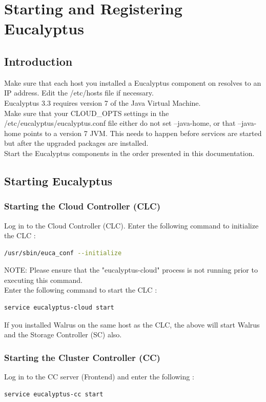 \chapter{Starting and Registering Eucalyptus}

\section{Introduction}
Make sure that each host you installed a Eucalyptus component on resolves to an IP address. Edit the /etc/hosts file if necessary. \\
Eucalyptus 3.3 requires version 7 of the Java Virtual Machine. \\
Make sure that your CLOUD\_OPTS settings in the /etc/eucalyptus/eucalyptus.conf file either do not set --java-home, or that --java-home points to a version 7 JVM. This needs to happen before services are started but after the upgraded packages are installed.\\
Start the Eucalyptus components in the order presented in this documentation.
\section{Starting Eucalyptus}
\subsection{Starting the Cloud Controller (CLC)}

Log in to the Cloud Controller (CLC).
Enter the following command to initialize the CLC :
\begin{lstlisting}[language=bash]
/usr/sbin/euca_conf --initialize
\end{lstlisting}
NOTE: Please ensure that the "eucalyptus-cloud" process is not running prior to executing this command.\\ \linebreak
Enter the following command to start the CLC : 
\begin{lstlisting}[language=bash]
service eucalyptus-cloud start
\end{lstlisting}
If you installed Walrus on the same host as the CLC, the above will start Walrus and the Storage Controller (SC) also.
\subsection{Starting the Cluster Controller (CC)}
Log in to the CC server (Frontend) and enter the following :
\begin{lstlisting}[language=bash]
service eucalyptus-cc start
\end{lstlisting}
